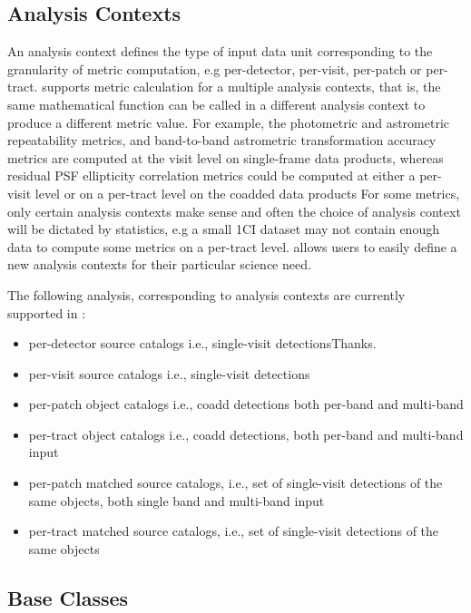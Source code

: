 \subsection{Analysis Contexts} \label{ssec:analysis_context}

An analysis context defines the type of input data unit corresponding to the granularity of metric computation, e.g per-detector, per-visit, per-patch or per-tract.
\faro supports metric calculation for a multiple analysis contexts, that is, the same mathematical function can be called in a different analysis context to produce a different metric value. 
For example, the photometric and astrometric repeatability metrics,  and  band-to-band astrometric transformation accuracy metrics are computed  at the visit level on single-frame data products, whereas  residual PSF ellipticity correlation metrics could be computed at either a per-visit level or on a per-tract level on the coadded data products
For some metrics, only certain analysis contexts make sense and often the choice of analysis context will be dictated by statistics, e.g a small 1\degsq CI dataset may not contain enough data to compute some metrics on a per-tract level. 
\faro allows users to easily define a new analysis contexts for their particular science need. 

The following analysis, corresponding to analysis contexts  are currently supported in \faro:
\begin{itemize}
\item per-detector source catalogs i.e., single-visit detectionsThanks.
\item per-visit source catalogs i.e., single-visit detections
\item per-patch object catalogs i.e., coadd detections both per-band and multi-band
\item per-tract object catalogs i.e., coadd detections, both per-band and multi-band input
\item per-patch matched source catalogs, i.e., set of single-visit detections of the same objects, both single band and multi-band input
\item per-tract matched source catalogs, i.e., set of single-visit detections of the same objects 
\end{itemize}

\subsection{Base Classes} \label{ssec:base_classes}

